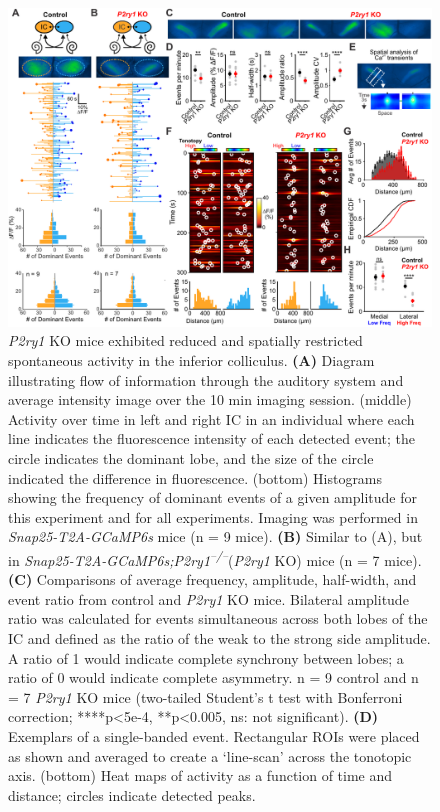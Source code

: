 \documentclass[9pt,lineno]{elife}
\begin{document}
\begin{figure}
\begin{fullwidth}
\includegraphics[width=.95\linewidth]{figures/Fig7.pdf}
\caption{\textit{P2ry1} KO mice exhibited reduced and spatially restricted spontaneous activity in the inferior colliculus.
\textbf{(A)} Diagram illustrating flow of information through the auditory system and average intensity image over the 10 min imaging session. (middle) Activity over time in left and right IC in an individual where each line indicates the fluorescence intensity of each detected event; the circle indicates the dominant lobe, and the size of the circle indicated the difference in fluorescence. (bottom) Histograms showing the frequency of dominant events of a given amplitude for this experiment and for all experiments. Imaging was performed in \textit{Snap25-T2A-GCaMP6s} mice (n = 9 mice).
\textbf{(B)} Similar to (A), but in \textit{Snap25-T2A-GCaMP6s;P2ry1\textsuperscript{–/–}}(\textit{P2ry1} KO) mice (n = 7 mice).
\textbf{(C)} Comparisons of average frequency, amplitude, half-width, and event ratio from control and \textit{P2ry1} KO mice. Bilateral amplitude ratio was calculated for events simultaneous across both lobes of the IC and defined as the ratio of the weak to the strong side amplitude. A ratio of 1 would indicate complete synchrony between lobes; a ratio of 0 would indicate complete asymmetry. n = 9 control and n = 7 \textit{P2ry1} KO mice (two-tailed Student’s t test with Bonferroni correction; ****p<5e-4, **p<0.005, ns: not significant).
\textbf{(D)} Exemplars of a single-banded event. Rectangular ROIs were placed as shown and averaged to create a `line-scan' across the tonotopic axis. (bottom) Heat maps of activity as a function of time and distance; circles indicate detected peaks.
}
\end{fullwidth}
\end{figure}
\end{document}
